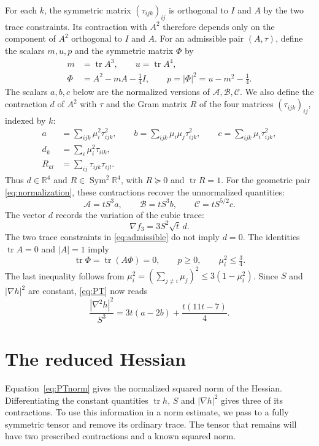 \documentclass[11pt,a4paper]{amsart}
\numberwithin{equation}{section}
\theoremstyle{definition}
\theoremstyle{remark}
\DeclareMathOperator{\tr}{tr}
\DeclareMathOperator{\Sym}{Sym}
\newcommand{\R}{\mathbb R}
\begin{document}
For each $k$, the symmetric matrix $(\tau_{ijk})_{ij}$ is orthogonal
to $I$ and $A$ by the two trace constraints. Its contraction with
$A^2$ therefore depends only on the component of $A^2$ orthogonal
to $I$ and $A$.
For an admissible pair $(A,\tau)$, define the scalars $m,u,p$ and
the symmetric matrix $\Phi$ by
\begin{align}
 m&=\tr A^3,\qquad u=\tr A^4,\label{eq:moments}\\
 \Phi&=A^2-mA-\tfrac14I,\qquad
 p=|\Phi|^2=u-m^2-\tfrac14.\label{eq:phi}
\end{align}
The scalars $a,b,c$ below are the normalized versions of
$\mathcal A,\mathcal B,\mathcal C$. We also define the contraction
$d$ of $A^2$ with $\tau$ and the Gram matrix $R$ of the four
matrices $(\tau_{ijk})_{ij}$, indexed by $k$:
\begin{align}
 a&=\sum_{ijk}\mu_i^2\tau_{ijk}^2,\qquad
 b=\sum_{ijk}\mu_i\mu_j\tau_{ijk}^2,\qquad
 c=\sum_{ijk}\mu_i\tau_{ijk}^2,\label{eq:abc}\\
 d_k&=\sum_i\mu_i^2\tau_{iik},\label{eq:d}\\
 R_{kl}&=\sum_{ij}\tau_{ijk}\tau_{ijl}.\label{eq:Rmu}
\end{align}
Thus $d\in\R^4$ and $R\in\Sym^2\R^4$, with
$R\succeq0$ and $\tr R=1$.
For the geometric pair \eqref{eq:normalization}, these contractions
recover the unnormalized quantities:
\[
 \mathcal A=tS^3a,\qquad \mathcal B=tS^3b,\qquad
 \mathcal C=tS^{5/2}c.
\]
The vector $d$ records the variation of the cubic trace:
\[
 \nabla f_3=3S^2\sqrt t\,d.
\]
The two trace constraints in \eqref{eq:admissible} do not imply $d=0$.
The identities $\tr A=0$ and $|A|=1$ imply
\begin{equation}\label{eq:phiorth}
 \tr\Phi=\tr(A\Phi)=0,\qquad
 p\ge0,\qquad \mu_i^2\le\tfrac34.
\end{equation}
The last inequality follows from
$\mu_i^2=(\sum_{j\ne i}\mu_j)^2\le3(1-\mu_i^2)$.
Since $S$ and $|\nabla h|^2$ are constant, \eqref{eq:PT} now reads
\begin{equation}\label{eq:PTnorm}
 \frac{|\nabla^2h|^2}{S^3}
       =3t(a-2b)+\frac{t(11t-7)}4.
\end{equation}

\section{The reduced Hessian}\label{sec:Hessian}
Equation~\eqref{eq:PTnorm} gives the normalized squared norm of the
Hessian. Differentiating the constant quantities $\tr h$, $S$ and
$|\nabla h|^2$ gives three of its contractions.
To use this information in a norm estimate, we pass to a fully symmetric
tensor and remove its ordinary trace. The tensor that remains will have
two prescribed contractions and a known squared norm.
\end{document}
